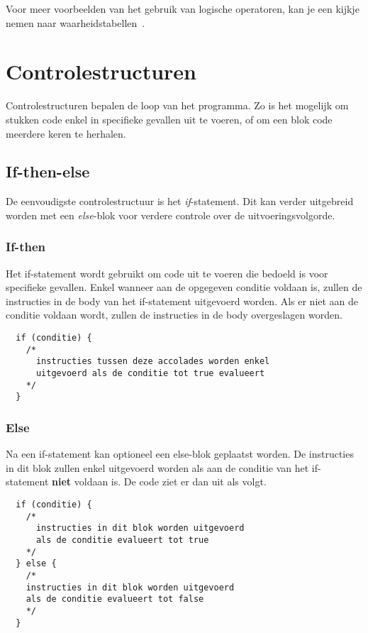 \documentclass[11pt,fleqn]{book} %
\begin{document}
\noindent Voor meer voorbeelden van het gebruik van logische operatoren, kan je een kijkje nemen naar waarheidstabellen~\cite{wiki:Waarheidstabel}.


\chapter{Controlestructuren}
Controlestructuren bepalen de loop van het programma. Zo is het mogelijk om stukken code enkel in specifieke gevallen uit te voeren, of om een blok code meerdere keren te herhalen.
\section{If-then-else}
De eenvoudigste controlestructuur is het \emph{if}-statement. Dit kan verder uitgebreid worden met een \emph{else}-blok voor verdere controle over de uitvoeringsvolgorde.

\subsection{If-then}
Het if-statement wordt gebruikt om code uit te voeren die bedoeld is voor specifieke gevallen. Enkel wanneer aan de opgegeven conditie voldaan is, zullen de instructies in de body van het if-statement uitgevoerd worden. Als er niet aan de conditie voldaan wordt, zullen de instructies in de body overgeslagen worden.

\begin{definition}[If]
	\phantom{ }
	\begin{verbatim}
  if (conditie) {
    /*
      instructies tussen deze accolades worden enkel 
      uitgevoerd als de conditie tot true evalueert
    */
  }
	\end{verbatim}
	\vspace{0cm}
\end{definition}

\pagebreak

\subsection{Else}
Na een if-statement kan optioneel een else-blok geplaatst worden. De instructies in dit blok zullen enkel uitgevoerd worden als aan de conditie van het if-statement \textbf{niet} voldaan is. De code ziet er dan uit als volgt.

\begin{definition}
	\phantom{ }
	\begin{verbatim}
  if (conditie) {
    /*
      instructies in dit blok worden uitgevoerd 
      als de conditie evalueert tot true
    */
  } else {
    /*
    instructies in dit blok worden uitgevoerd 
    als de conditie evalueert tot false
    */
  }
	\end{verbatim}
\end{definition}
\end{document}
